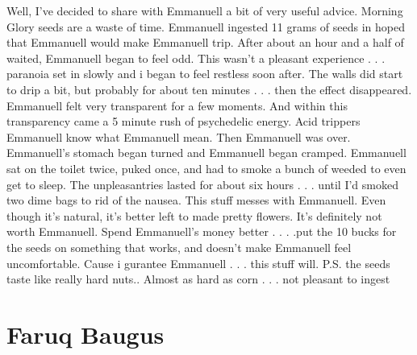 \documentclass[12pt]{book}
\begin{document}
Well, I've decided to share with Emmanuell a bit of very useful advice. Morning Glory seeds are a waste of time. Emmanuell ingested 11 grams of seeds in hoped that Emmanuell would make Emmanuell trip. After about an hour and a half of waited, Emmanuell began to feel odd. This wasn't a pleasant experience . . .  paranoia set in slowly and i began to feel restless soon after. The walls did start to drip a bit, but probably for about ten minutes . . .  then the effect disappeared. Emmanuell felt very transparent for a few moments. And within this transparency came a 5 minute rush of psychedelic energy. Acid trippers Emmanuell know what Emmanuell mean. Then Emmanuell was over. Emmanuell's stomach began turned and Emmanuell began cramped. Emmanuell sat on the toilet twice, puked once, and had to smoke a bunch of weeded to even get to sleep. The unpleasantries lasted for about six hours . . .  until I'd smoked two dime bags to rid of the nausea. This stuff messes with Emmanuell. Even though it's natural, it's better left to made pretty flowers. It's definitely not worth Emmanuell. Spend Emmanuell's money better . . .  .put the 10 bucks for the seeds on something that works, and doesn't make Emmanuell feel uncomfortable. Cause i gurantee Emmanuell  . . .  this stuff will. P.S. the seeds taste like really hard nuts.. Almost as hard as corn . . .  not pleasant to ingest



\chapter{Faruq Baugus}
\end{document}
